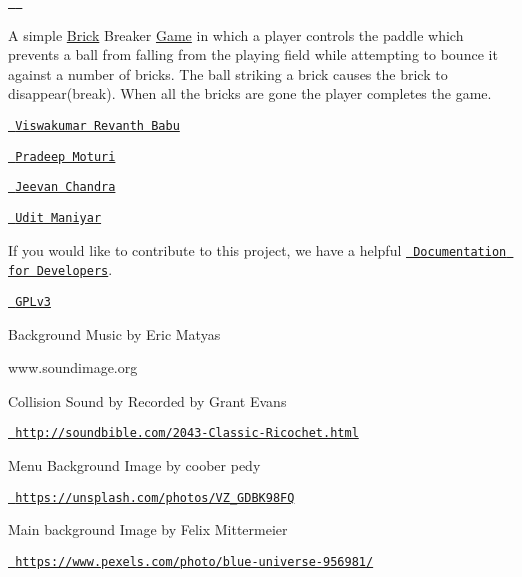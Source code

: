 \href{https://travis-ci.com/IITH-SBJoshi/concurrency-1}{\texttt{ }} \href{https://www.gnu.org/licenses/lgpl-3.0}{\texttt{ }} 

A simple \mbox{\hyperlink{class_brick}{Brick}} Breaker \mbox{\hyperlink{class_game}{Game}} in which a player controls the paddle which prevents a ball from falling from the playing field while attempting to bounce it against a number of bricks. The ball striking a brick causes the brick to disappear(break). When all the bricks are gone the player completes the game.


\begin{DoxyCode}{0}
\end{DoxyCode}
 


\begin{DoxyCode}{0}
\end{DoxyCode}
 


\begin{DoxyCode}{0}
\end{DoxyCode}



\begin{DoxyItemize}
\item \href{https://github.com/re1nth}{\texttt{ Viswakumar Revanth Babu}}
\item \href{https://github.com/PradeepMoturi}{\texttt{ Pradeep Moturi}}
\item \href{https://github.com/Jeevan-Chandra}{\texttt{ Jeevan Chandra}}
\item \href{https://github.com/UditManiyar}{\texttt{ Udit Maniyar}}
\end{DoxyItemize}

If you would like to contribute to this project, we have a helpful \href{https://iith-sbjoshi.github.io/concurrency-1/}{\texttt{ Documentation for Developers}}.

\href{http://www.gnu.org/licenses/gpl-3.0.txt}{\texttt{ G\+P\+Lv3}}


\begin{DoxyItemize}
\item Background Music by Eric Matyas

www.\+soundimage.\+org
\item Collision Sound by Recorded by Grant Evans

\href{http://soundbible.com/2043-Classic-Ricochet.html}{\texttt{ http\+://soundbible.\+com/2043-\/\+Classic-\/\+Ricochet.\+html}}
\item Menu Background Image by coober pedy

\href{https://unsplash.com/photos/VZ_GDBK98FQ}{\texttt{ https\+://unsplash.\+com/photos/\+V\+Z\+\_\+\+G\+D\+B\+K98\+FQ}}
\item Main background Image by Felix Mittermeier

\href{https://www.pexels.com/photo/blue-universe-956981/}{\texttt{ https\+://www.\+pexels.\+com/photo/blue-\/universe-\/956981/}} 
\end{DoxyItemize}